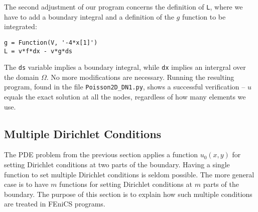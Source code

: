 The second adjustment of our program concerns the definition of {\fontsize{12pt}{12pt}\texttt{L}},
where we have to add a boundary integral and a definition of the $g$
function to be integrated:
\begin{Verbatim}[fontsize=\fontsize{10pt}{10pt},tabsize=8,baselinestretch=1.05,
fontfamily=tt,xleftmargin=7mm]
g = Function(V, '-4*x[1]')
L = v*f*dx - v*g*ds
\end{Verbatim}
\noindent
The {\fontsize{12pt}{12pt}\verb!ds!} variable implies a boundary integral, while {\fontsize{12pt}{12pt}\verb!dx!}
implies an intergral over the domain $\Omega$.
No more modifications are necessary. Running the resulting program,
found in the file {\fontsize{12pt}{12pt}\verb!Poisson2D_DN1.py!}, shows a
successful verification -- 
$u$ equals the exact solution at all the nodes, regardless of
how many elements we use.

\subsection{Multiple Dirichlet Conditions}
\label{langtangen:poisson:multiple:Dirichlet}

The PDE problem from the previous section applies a function $u_0(x,y)$
for setting Dirichlet conditions at two parts of the boundary.
Having a single function to set multiple Dirichlet conditions is
seldom possible. The more general case is to have $m$ functions for
setting Dirichlet conditions at $m$ parts of the boundary. 
The purpose of this section is to explain how such multiple conditions
are treated in FEniCS programs.

